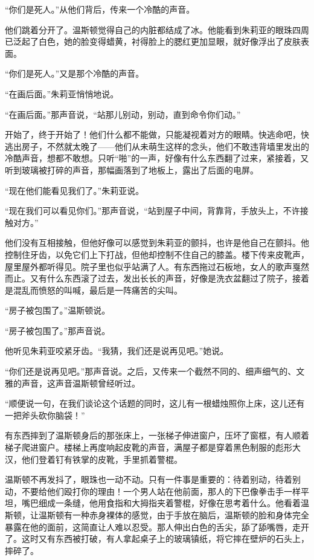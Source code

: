 ``你们是死人。''从他们背后，传来一个冷酷的声音。

他们跳着分开了。温斯顿觉得自己的内脏都结成了冰。他能看到朱莉亚的眼珠四周已泛起了白色，她的脸变得蜡黄，衬得脸上的腮红更加显眼，就好像浮出了皮肤表面。

``你们是死人。''又是那个冷酷的声音。

``在画后面。''朱莉亚悄悄地说。

``在画后面。''那声音说，``站那儿别动，别动，直到命令你们动。''

开始了，终于开始了！他们什么都不能做，只能凝视着对方的眼睛。快逃命吧，快逃出房子，不然就太晚了------他们从未萌生这样的念头，他们不敢违背墙里发出的冷酷声音，想都不敢想。只听``啪''的一声，好像有什么东西翻了过来，紧接着，又听到玻璃被打碎的声音，那幅画落到了地板上，露出了后面的电屏。

``现在他们能看见我们了。''朱莉亚说。

``现在我们可以看见你们。''那声音说，``站到屋子中间，背靠背，手放头上，不许接触对方。''

他们没有互相接触，但他好像可以感觉到朱莉亚的颤抖，也许是他自己在颤抖。他控制住牙齿，以免它们上下打战，但他却控制不住自己的膝盖。楼下传来皮靴声，屋里屋外都听得见。院子里也似乎站满了人。有东西拖过石板地，女人的歌声戛然而止。又有什么东西滚了过去，发出长长的声音，好像是洗衣盆翻过了院子，接着是混乱而愤怒的叫喊，最后是一阵痛苦的尖叫。

``房子被包围了。''温斯顿说。

``房子被包围了。''那声音说。

他听见朱莉亚咬紧牙齿。``我猜，我们还是说再见吧。''她说。

``你们还是说再见吧。''那声音说。之后，又传来一个截然不同的、细声细气的、文雅的声音，这声音温斯顿曾经听过。

``顺便说一句，在我们谈论这个话题的同时，这儿有一根蜡烛照你上床，这儿还有一把斧头砍你脑袋！''

有东西摔到了温斯顿身后的那张床上，一张梯子伸进窗户，压坏了窗框，有人顺着梯子爬进窗户。楼梯上再度响起皮靴的声音，满屋子都是穿着黑色制服的彪形大汉，他们登着钉有铁掌的皮靴，手里抓着警棍。

温斯顿不再发抖了，眼珠也一动不动。只有一件事是重要的：待着别动，待着别动，不要给他们殴打你的理由！一个男人站在他前面，那人的下巴像拳击手一样平坦，嘴巴细成一条缝，他用食指和大拇指夹着警棍，好像在思考着什么。他看着温斯顿，让温斯顿有一种赤身裸体的感觉，由于手放在脑后，温斯顿的脸和身体完全暴露在他的面前，这简直让人难以忍受。那人伸出白色的舌尖，舔了舔嘴唇，走开了。这时又有东西被打破，有人拿起桌子上的玻璃镇纸，将它摔在壁炉的石头上，摔碎了。

